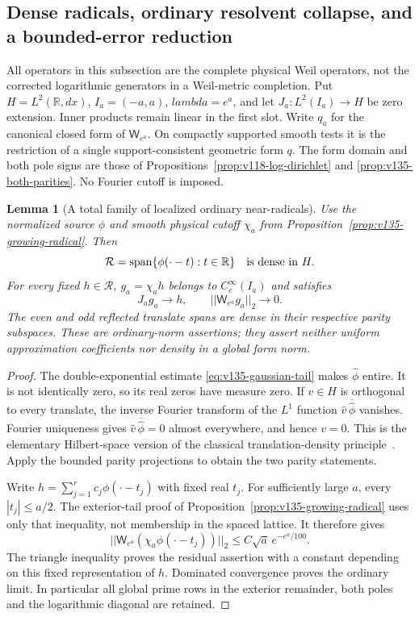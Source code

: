 \documentclass[11pt]{article}
\def\lambda{lambda}%
\def\norm#1{||#1||}%
\newtheorem{lemma}[theorem]{Lemma}
\theoremstyle{remark}
\newcommand{\norm}[1]{\left\lVert #1\right\rVert}
\begin{document}
\subsection{Dense radicals, ordinary resolvent collapse, and a bounded-error reduction}

All operators in this subsection are the complete physical Weil operators,
not the corrected logarithmic generators in a Weil-metric completion.
Put $H=L^2(\mathbb R,dx)$, $I_a=(-a,a)$, $\lambda=e^a$, and let
$J_a:L^2(I_a)\to H$ be zero extension. Inner products remain linear in
the first slot. Write $q_a$ for the canonical closed form of
$\mathsf W_{e^a}$. On compactly supported smooth tests it is the
restriction of a single support-consistent geometric form $q$.
The form domain and both pole signs are those of
Propositions~\ref{prop:v118-log-dirichlet} and
\ref{prop:v135-both-parities}. No Fourier cutoff is imposed.

\begin{lemma}[A total family of localized ordinary near-radicals]
\label{lem:v136-total-radicals}
Use the normalized source $\phi$ and smooth physical cutoff $\chi_a$
from Proposition~\ref{prop:v135-growing-radical}. Then
\[
 \mathcal R=\operatorname{span}\{\phi(\cdot-t):t\in\mathbb R\}
 \quad\hbox{is dense in }H.
\]
For every fixed $h\in\mathcal R$, $g_a=\chi_a h$ belongs to
$C_c^\infty(I_a)$ and satisfies
\begin{equation}\label{eq:v136-dense-residual}
 J_ag_a\longrightarrow h,\qquad
 \norm{\mathsf W_{e^a}g_a}_2\longrightarrow0.
\end{equation}
The even and odd reflected translate spans are dense in their respective
parity subspaces. These are ordinary-norm assertions; they assert neither
uniform approximation coefficients nor density in a global form norm.
\end{lemma}
\begin{proof}
The double-exponential estimate \eqref{eq:v135-gaussian-tail} makes
$\widehat\phi$ entire. It is not identically zero, so its real zeros
have measure zero. If $v\in H$ is orthogonal to every translate, the
inverse Fourier transform of the $L^1$ function
$\widehat v\,\overline{\widehat\phi}$ vanishes. Fourier uniqueness
gives $\widehat v\,\overline{\widehat\phi}=0$ almost everywhere,
and hence $v=0$. This is the elementary Hilbert-space version of the
classical translation-density principle~\cite{Wiener1932}.
Apply the bounded parity projections to obtain the two parity statements.

Write $h=\sum_{j=1}^r c_j\phi(\cdot-t_j)$ with fixed real $t_j$.
For sufficiently large $a$, every $|t_j|\le a/2$. The exterior-tail
proof of Proposition~\ref{prop:v135-growing-radical} uses only that
inequality, not membership in the spaced lattice. It therefore gives
\[
 \norm{\mathsf W_{e^a}(\chi_a\phi(\cdot-t_j))}_2
 \le C\sqrt a\,e^{-e^a/100}.
\]
The triangle inequality proves the residual assertion with a constant
depending on this fixed representation of $h$. Dominated convergence
proves the ordinary limit. In particular all global prime rows in the
exterior remainder, both poles and the logarithmic diagonal are retained.
\end{proof}
\end{document}
